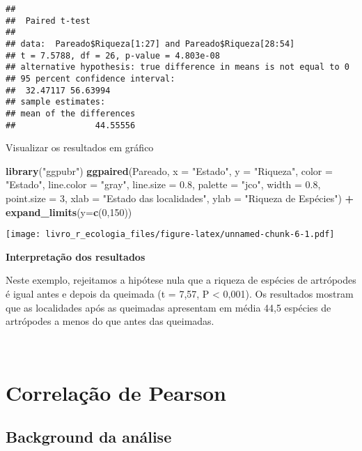 \documentclass[
]{book}
\newenvironment{Shaded}{\begin{snugshade}}{\end{snugshade}}
\newcommand{\DataTypeTok}[1]{\textcolor[rgb]{0.13,0.29,0.53}{#1}}
\newcommand{\DecValTok}[1]{\textcolor[rgb]{0.00,0.00,0.81}{#1}}
\newcommand{\FloatTok}[1]{\textcolor[rgb]{0.00,0.00,0.81}{#1}}
\newcommand{\KeywordTok}[1]{\textcolor[rgb]{0.13,0.29,0.53}{\textbf{#1}}}
\newcommand{\NormalTok}[1]{#1}
\newcommand{\OperatorTok}[1]{\textcolor[rgb]{0.81,0.36,0.00}{\textbf{#1}}}
\newcommand{\StringTok}[1]{\textcolor[rgb]{0.31,0.60,0.02}{#1}}
\begin{document}
\begin{verbatim}
## 
## 	Paired t-test
## 
## data:  Pareado$Riqueza[1:27] and Pareado$Riqueza[28:54]
## t = 7.5788, df = 26, p-value = 4.803e-08
## alternative hypothesis: true difference in means is not equal to 0
## 95 percent confidence interval:
##  32.47117 56.63994
## sample estimates:
## mean of the differences 
##                44.55556
\end{verbatim}

Visualizar os resultados em gráfico

\begin{Shaded}
\begin{Highlighting}[]
\KeywordTok{library}\NormalTok{(}\StringTok{"ggpubr"}\NormalTok{)}
\KeywordTok{ggpaired}\NormalTok{(Pareado, }\DataTypeTok{x =} \StringTok{"Estado"}\NormalTok{, }\DataTypeTok{y =} \StringTok{"Riqueza"}\NormalTok{,}
         \DataTypeTok{color =} \StringTok{"Estado"}\NormalTok{, }\DataTypeTok{line.color =} \StringTok{"gray"}\NormalTok{, }\DataTypeTok{line.size =} \FloatTok{0.8}\NormalTok{, }\DataTypeTok{palette =} \StringTok{"jco"}\NormalTok{, }\DataTypeTok{width =} \FloatTok{0.8}\NormalTok{,}
         \DataTypeTok{point.size =} \DecValTok{3}\NormalTok{, }\DataTypeTok{xlab =} \StringTok{"Estado das localidades"}\NormalTok{, }\DataTypeTok{ylab =} \StringTok{"Riqueza de Espécies"}\NormalTok{) }\OperatorTok{+}
\StringTok{  }\KeywordTok{expand_limits}\NormalTok{(}\DataTypeTok{y=}\KeywordTok{c}\NormalTok{(}\DecValTok{0}\NormalTok{,}\DecValTok{150}\NormalTok{)) }
\end{Highlighting}
\end{Shaded}

\texttt{[image: livro\_r\_ecologia\_files/figure-latex/unnamed-chunk-6-1.pdf]}

\textbf{Interpretação dos resultados}

Neste exemplo, rejeitamos a hipótese nula que a riqueza de espécies de artrópodes é igual antes e depois da queimada (t = 7,57, P \textless{} 0,001). Os resultados mostram que as localidades após as queimadas apresentam em média 44,5 espécies de artrópodes a menos do que antes das queimadas.

~

\hypertarget{correlauxe7uxe3o-de-pearson}{%
\section{Correlação de Pearson}\label{correlauxe7uxe3o-de-pearson}}

\hypertarget{background-da-anuxe1lise-2}{%
\subsection{Background da análise}\label{background-da-anuxe1lise-2}}
\end{document}
